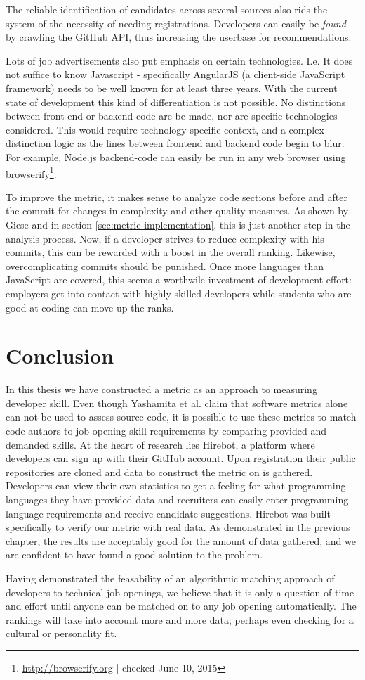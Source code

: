 The reliable identification of candidates across several sources also rids the system of the necessity of needing registrations. Developers can easily be \textit{found} by crawling the GitHub API, thus increasing the userbase for recommendations.


Lots of job advertisements also put emphasis on certain technologies. I.e. It does not suffice to know Javascript - specifically AngularJS (a client-side JavaScript framework) needs to be well known for at least three years. With the current state of development this kind of differentiation is not possible. No distinctions between front-end or backend code are be made, nor are specific technologies considered. This would require technology-specific context, and a complex distinction logic as the lines between frontend and backend code begin to blur. For example, Node.js backend-code can easily be run in any web browser using browserify\footnote{\url{http://browserify.org} | checked June 10, 2015}.
\newline

To improve the metric, it makes sense to analyze code sections before and after the commit for changes in complexity and other quality measures. As shown by Giese \cite{pg:2014} and in section \ref{sec:metric-implementation}, this is just another step in the analysis process. Now, if a developer strives to reduce complexity with his commits, this can be rewarded with a boost in the overall ranking. Likewise, overcomplicating commits should be punished. Once more languages than JavaScript are covered, this seems a worthwile investment of development effort: employers get into contact with highly skilled developers while students who are good at coding can move up the ranks.

\section{Conclusion}
In this thesis we have constructed a metric as an approach to measuring developer skill. Even though Yashamita et al. claim that software metrics alone can not be used to assess source code\cite{mlya:2012}, it is possible to use these metrics to match code authors to job opening skill requirements by comparing provided and demanded skills. At the heart of research lies Hirebot, a platform where developers can sign up with their GitHub account. Upon registration their public repositories are cloned and data to construct the metric on is gathered. Developers can view their own statistics to get a feeling for what programming languages they have provided data and recruiters can easily enter programming language requirements and receive candidate suggestions. Hirebot was built specifically to verify our metric with real data. As demonstrated in the previous chapter, the results are acceptably good for the amount of data gathered, and we are confident to have found a good solution to the problem.

Having demonstrated the feasability of an algorithmic matching approach of developers to technical job openings, we believe that it is only a question of time and effort until anyone can be matched on to any job opening automatically. The rankings will take into account more and more data, perhaps even checking for a cultural or personality fit.